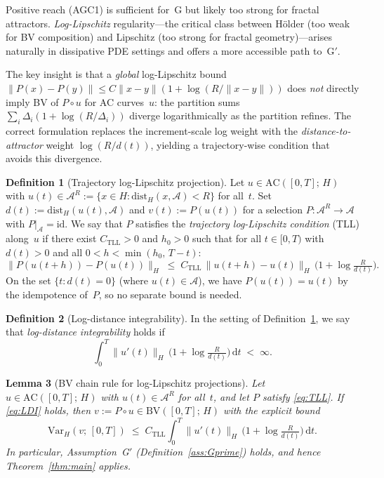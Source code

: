 \documentclass[12pt,a4paper]{article}
\theoremstyle{definition}
\newtheorem{definition}{Definition}[section]
\theoremstyle{plain}
\newtheorem{lemma}[definition]{Lemma}
\theoremstyle{remark}
\begin{document}
Positive reach (AGC1) is sufficient for~G but likely too strong for
fractal attractors.  \emph{Log-Lipschitz} regularity---the critical
class between H\"older (too weak for BV composition) and Lipschitz
(too strong for fractal geometry)---arises naturally in dissipative
PDE settings and offers a more accessible path to~G$'$.

The key insight is that a \emph{global} log-Lipschitz bound
$\|P(x)-P(y)\| \le C\|x-y\|(1+\log(R/\|x-y\|))$ does
\emph{not} directly imply BV of $P\circ u$ for AC curves~$u$:
the partition sums $\sum_i \Delta_i(1+\log(R/\Delta_i))$ diverge
logarithmically as the partition refines.  The correct formulation
replaces the increment-scale log weight with the
\emph{distance-to-attractor} weight $\log(R/d(t))$, yielding a
trajectory-wise condition that avoids this divergence.

\begin{definition}[Trajectory log-Lipschitz projection]
\label{def:TLL}
Let $u \in \mathrm{AC}([0,T];\,H)$ with $u(t) \in \mathcal{A}^R
:= \{x \in H : \mathrm{dist}_H(x,\mathcal{A}) < R\}$ for all~$t$.
Set $d(t) := \mathrm{dist}_H(u(t),\mathcal{A})$ and
$v(t) := P(u(t))$ for a selection
$P: \mathcal{A}^R \to \mathcal{A}$ with $P|_{\mathcal{A}} = \mathrm{id}$.
We say that $P$ satisfies the \emph{trajectory log-Lipschitz
condition} (TLL) along~$u$ if there exist $C_{\mathrm{TLL}} > 0$ and
$h_0 > 0$ such that for all $t \in [0,T)$ with $d(t) > 0$ and
all $0 < h < \min(h_0,\, T-t)$:
\begin{equation}\label{eq:TLL}
  \|P(u(t\!+\!h)) - P(u(t))\|_H
  \;\le\;
  C_{\mathrm{TLL}}\,\|u(t\!+\!h) - u(t)\|_H\,
  \bigl(1 + \log\tfrac{R}{d(t)}\bigr).
  \tag{TLL}
\end{equation}
On the set $\{t : d(t)=0\}$ (where $u(t) \in \mathcal{A}$), we have
$P(u(t)) = u(t)$ by the idempotence of~$P$, so no separate bound
is needed.
\end{definition}

\begin{definition}[Log-distance integrability]
\label{def:LDI}
In the setting of Definition~\ref{def:TLL}, we say that
\emph{log-distance integrability} holds if
\begin{equation}\label{eq:LDI}
  \int_0^T \|u'(t)\|_H\,
  \bigl(1 + \log\tfrac{R}{d(t)}\bigr)\,\mathrm{d}t
  \;<\; \infty.
  \tag{LDI}
\end{equation}
\end{definition}

\begin{lemma}[BV chain rule for log-Lipschitz projections]
\label{lem:LL-BV}
Let $u \in \mathrm{AC}([0,T];\,H)$ with $u(t) \in \mathcal{A}^R$
for all~$t$, and let $P$ satisfy \eqref{eq:TLL}.
If \eqref{eq:LDI} holds, then $v := P\circ u \in \mathrm{BV}([0,T];\,H)$
with the explicit bound
\begin{equation}\label{eq:BV-bound}
  \mathrm{Var}_H(v;\,[0,T])
  \;\le\;
  C_{\mathrm{TLL}}
  \int_0^T \|u'(t)\|_H\,
  \bigl(1 + \log\tfrac{R}{d(t)}\bigr)\,\mathrm{d}t.
\end{equation}
In particular, Assumption~G$'$
\textup{(}Definition~\ref{ass:Gprime}\textup{)} holds, and hence
Theorem~\ref{thm:main} applies.
\end{lemma}
\end{document}
